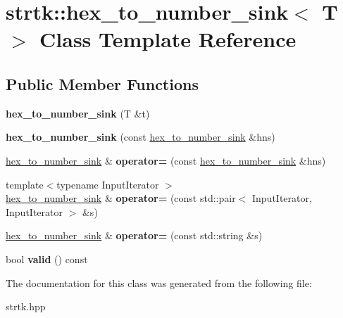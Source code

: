 \hypertarget{classstrtk_1_1hex__to__number__sink}{\section{strtk\-:\-:hex\-\_\-to\-\_\-number\-\_\-sink$<$ T $>$ Class Template Reference}
\label{classstrtk_1_1hex__to__number__sink}
}
\subsection*{Public Member Functions}
\begin{DoxyCompactItemize}
\item 
\hypertarget{classstrtk_1_1hex__to__number__sink_ae7f365203f38fbd5ccd43e5e6ba28685}{{\bfseries hex\-\_\-to\-\_\-number\-\_\-sink} (T \&t)}\label{classstrtk_1_1hex__to__number__sink_ae7f365203f38fbd5ccd43e5e6ba28685}

\item 
\hypertarget{classstrtk_1_1hex__to__number__sink_ace194656c2d8303ecb27c9116148b9c4}{{\bfseries hex\-\_\-to\-\_\-number\-\_\-sink} (const \hyperlink{classstrtk_1_1hex__to__number__sink}{hex\-\_\-to\-\_\-number\-\_\-sink} \&hns)}\label{classstrtk_1_1hex__to__number__sink_ace194656c2d8303ecb27c9116148b9c4}

\item 
\hypertarget{classstrtk_1_1hex__to__number__sink_a8b088b6f9b0a3ae942661ecf727db5b5}{\hyperlink{classstrtk_1_1hex__to__number__sink}{hex\-\_\-to\-\_\-number\-\_\-sink} \& {\bfseries operator=} (const \hyperlink{classstrtk_1_1hex__to__number__sink}{hex\-\_\-to\-\_\-number\-\_\-sink} \&hns)}\label{classstrtk_1_1hex__to__number__sink_a8b088b6f9b0a3ae942661ecf727db5b5}

\item 
\hypertarget{classstrtk_1_1hex__to__number__sink_a819bcf5f2aa99f5f3810bccbe6449583}{{\footnotesize template$<$typename Input\-Iterator $>$ }\\\hyperlink{classstrtk_1_1hex__to__number__sink}{hex\-\_\-to\-\_\-number\-\_\-sink} \& {\bfseries operator=} (const std\-::pair$<$ Input\-Iterator, Input\-Iterator $>$ \&s)}\label{classstrtk_1_1hex__to__number__sink_a819bcf5f2aa99f5f3810bccbe6449583}

\item 
\hypertarget{classstrtk_1_1hex__to__number__sink_a81593e6bf0e47811dbbd4f0c78726054}{\hyperlink{classstrtk_1_1hex__to__number__sink}{hex\-\_\-to\-\_\-number\-\_\-sink} \& {\bfseries operator=} (const std\-::string \&s)}\label{classstrtk_1_1hex__to__number__sink_a81593e6bf0e47811dbbd4f0c78726054}

\item 
\hypertarget{classstrtk_1_1hex__to__number__sink_abb107c0a5139f6457fa2286da2297078}{bool {\bfseries valid} () const }\label{classstrtk_1_1hex__to__number__sink_abb107c0a5139f6457fa2286da2297078}

\end{DoxyCompactItemize}


The documentation for this class was generated from the following file\-:\begin{DoxyCompactItemize}
\item 
strtk.\-hpp\end{DoxyCompactItemize}

